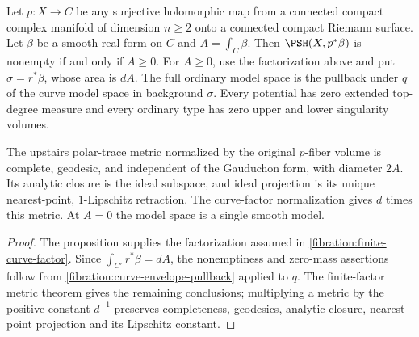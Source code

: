 \begin{corollary}\label{draft649:full-curve-model-factor}
Let $p:X\to C$ be any surjective holomorphic map from a
connected compact complex manifold of dimension $n\geq2$
onto a connected compact Riemann surface. Let $\beta$ be a
smooth real form on $C$ and $A=\int_C\beta$. Then
$\PSH(X,p^*\beta)$ is nonempty if and only if $A\geq0$.
For $A\geq0$, use the factorization above and put
$\sigma=r^*\beta$, whose area is $dA$. The full ordinary
model space is the pullback under $q$ of the curve model
space in background $\sigma$. Every potential has zero
extended top-degree measure and every ordinary type has
zero upper and lower singularity volumes.

The upstairs polar-trace metric normalized by the original
$p$-fiber volume is complete, geodesic, and independent of
the Gauduchon form, with diameter $2A$. Its analytic closure
is the ideal subspace, and ideal projection is its unique
nearest-point, $1$-Lipschitz retraction. The curve-factor
normalization gives $d$ times this metric. At $A=0$ the
model space is a single smooth model.
\end{corollary}
\begin{proof}
The proposition supplies the factorization assumed in
\cref{fibration:finite-curve-factor}. Since
$\int_{C'}r^*\beta=dA$, the nonemptiness and zero-mass
assertions follow from
\cref{fibration:curve-envelope-pullback} applied to $q$.
The finite-factor metric theorem gives the remaining
conclusions; multiplying a metric by the positive constant
$d^{-1}$ preserves completeness, geodesics, analytic closure,
nearest-point projection and its Lipschitz constant.
\end{proof}
